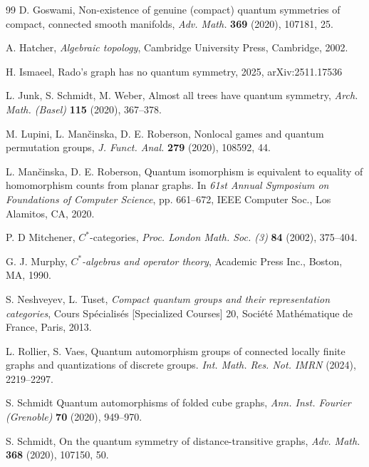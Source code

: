 \documentclass[a4paper]{amsart}
\numberwithin{equation}{section}
\theoremstyle{change}
\begin{document}
\begin{thebibliography}{99}
D. Goswami, Non-existence of genuine (compact) quantum symmetries of compact, connected smooth manifolds, \emph{Adv. Math.} \textbf{369} (2020), 107181, 25.

A. Hatcher, \emph{Algebraic topology},
Cambridge University Press, Cambridge, 2002. 

H. Ismaeel, Rado's graph has no quantum symmetry, 2025, arXiv:2511.17536

L. Junk, S. Schmidt, M. Weber, Almost all trees have quantum symmetry, \emph{Arch. Math. (Basel)} \textbf{115} (2020), 367--378. 

M. Lupini, L.  Man\v{c}inska, D. E. Roberson, Nonlocal games and quantum permutation groups,
\emph{J. Funct. Anal.} \textbf{279} (2020), 
108592, 44. 

L. Man\v{c}inska, D. E. Roberson, Quantum isomorphism is equivalent to equality of homomorphism counts from planar graphs. 
In \emph{61st {A}nnual {S}ymposium on {F}oundations of {C}omputer {S}cience}, pp. 661--672, IEEE Computer Soc., Los Alamitos, CA, 2020. 

P. D Mitchener, {$C^*$}-categories,
\emph{Proc. London Math. Soc. (3)} \textbf{84} (2002), 375--404. 

G. J. Murphy, \emph{{$C^*$}-algebras and operator theory}, Academic Press Inc., Boston, MA, 1990. 

S. Neshveyev, L. Tuset, \emph{Compact quantum groups and their representation categories}, 
Cours Sp\'{e}cialis\'{e}s [Specialized Courses] 20, Soci\'{e}t\'{e} Math\'{e}matique de France, Paris, 2013.

L. Rollier, S. Vaes, Quantum automorphism groups of connected locally finite graphs and quantizations of discrete groups. 
\emph{Int. Math. Res. Not. IMRN} (2024), 2219--2297. 

S. Schmidt Quantum automorphisms of folded cube graphs,
\emph{Ann. Inst. Fourier (Grenoble)} \textbf{70} (2020), 949--970. 

S. Schmidt, On the quantum symmetry of distance-transitive graphs, \emph{Adv. Math.} \textbf{368} (2020), 107150, 50. 


\end{thebibliography}
\end{document}
